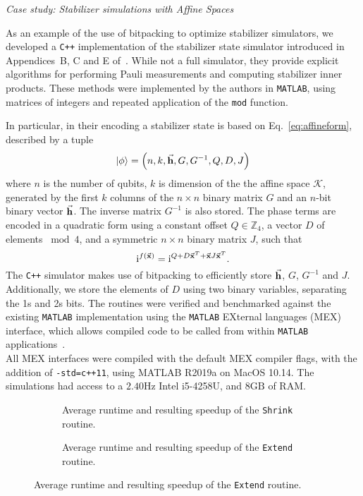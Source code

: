 \large{\itshape{Case study: Stabilizer simulations with Affine Spaces}}\par
As an example of the use of bitpacking to optimize stabilizer simulators, we developed a \texttt{C++} implementation of the stabilizer state simulator introduced in Appendices~B, C and E of~\cite{Bravyi2016}. While not a full simulator, they provide explicit algorithms for performing Pauli measurements and computing stabilizer inner products. These methods were implemented by the authors in \texttt{MATLAB}, using matrices of integers and repeated application of the \texttt{mod} function.\par
In particular, in their encoding a stabilizer state is based on Eq.~\ref{eq:affineform}, described by a tuple
\[\ket{\phi} = \left(n, k, \va{h}, G, G^{-1}, Q, D, J\right)\]
where $n$ is the number of qubits, $k$ is dimension of the the affine space $\mathcal{K}$, generated by the first $k$ columns of the $n\times n$ binary matrix $G$ and an $n$-bit binary vector $\va{h}$. The inverse matrix $G^{-1}$ is also stored. The phase terms are encoded in a quadratic form using a constant offset $Q\in\mathbb{Z}_{4}$, a vector $D$ of elements $\bmod{4}$, and a symmetric $n\times n$ binary matrix $J$, such that
\[\mathrm{i}^{f(\va{x})} = \mathrm{i}^{Q + D\va{x}^{T} + \va{x}J\va{x}^{T}}.\]
The \texttt{C++} simulator makes use of bitpacking to efficiently store $\va{h}$, $G$, $G^{-1}$ and $J$. Additionally, we store the elements of $D$ using two binary variables, separating the 1s and 2s bits. The routines were verified and benchmarked against the existing \texttt{MATLAB} implementation using the \texttt{MATLAB} EXternal languages (MEX) interface, which allows compiled code to be called from within \texttt{MATLAB} applications~\cite{MEXRef}.\\ All MEX interfaces were compiled with the default MEX compiler flags, with the addition of \texttt{-std=c++11}, using MATLAB R2019a on MacOS 10.14. The simulations had access to a $2.40\mathrm{Hz}$ Intel i5-4258U, and $8\mathrm{GB}$ of RAM.\par
\begin{figure}[p]
\centering
\caption{Figures showing the performance of the \texttt{MATLAB} and \texttt{C++} implementations of a stabilize simulator based on Affine Spaces.}\label{fig:affine_timings}
\begin{subfigure}[t]{0.9\textwidth}
    \begin{scaletikzpicturetowidth}{\textwidth}
        
    \end{scaletikzpicturetowidth}
    \caption{Average runtime and resulting speedup of the \texttt{Shrink} routine.}
\end{subfigure}
\begin{subfigure}[t]{0.9\textwidth}
    \caption{Average runtime and resulting speedup of the \texttt{Extend} routine.}
    \begin{scaletikzpicturetowidth}{\textwidth}
        
    \end{scaletikzpicturetowidth}
\end{subfigure}
\end{figure}

